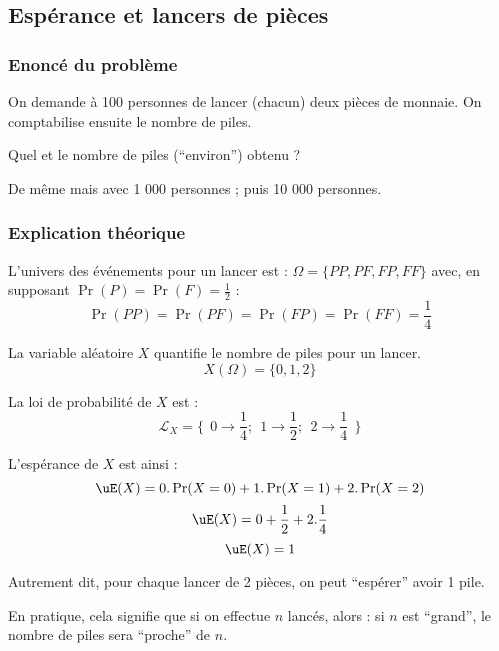 



\subsection{Espérance et lancers de pièces}
\subsubsection*{Enoncé du problème}

On demande à 100 personnes 
de lancer (chacun) deux pièces de monnaie.
On comptabilise ensuite le nombre de piles.

Quel et le nombre de piles (``environ'') obtenu ?


De même mais avec 1 000 personnes ; puis 10 000 personnes.


\subsubsection*{Explication théorique}

L'univers des événements pour un lancer est : 
$\Omega = \{PP, PF, FP, FF\}$
avec, en supposant 
$\Pr(P)=\Pr(F)=\frac{1}{2}$ :
$$
\Pr(PP) = \Pr(PF) = 
\Pr(FP) = \Pr(FF) = 
\frac{1}{4}
$$

La variable aléatoire $X$ quantifie le nombre de piles pour un lancer.
$$
X(\Omega) = \{0, 1, 2\}
$$

La loi de probabilité de $X$ est : 
$$
\mathcal{L}_X = \{
~~ 0 \rightarrow \frac{1}{4};
~~1 \rightarrow \frac{1}{2};
~~2 \rightarrow \frac{1}{4}
~~\}
$$

L'espérance de $X$ est ainsi :
$$\uE(X) = 0.\Pr(X=0) + 1.\Pr(X=1) + 2.\Pr(X=2)$$ 
$$\uE(X) = 0 + \frac{1}{2} + 2.\frac{1}{4}$$
$$\uE(X) = 1$$


Autrement dit, pour chaque lancer de 2 pièces, 
on peut ``espérer'' avoir 1 pile.

En pratique, cela signifie que si on effectue $n$ lancés,
alors :
si $n$ est ``grand'', le nombre de piles sera ``proche'' de $n$.


